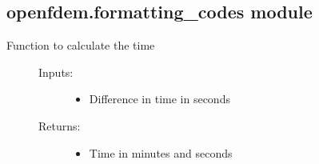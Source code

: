 \documentclass[letterpaper,10pt,english]{sphinxmanual}
\begin{document}
\subsection{openfdem.formatting\_codes module}
\label{\detokenize{openfdem:module-openfdem.formatting_codes}}\label{\detokenize{openfdem:openfdem-formatting-codes-module}}\begin{description}
\item[{Function to calculate the time}] \leavevmode\begin{description}
\item[{Inputs:}] \leavevmode\begin{itemize}
\item {} 
Difference in time in seconds

\end{itemize}

\item[{Returns:}] \leavevmode\begin{itemize}
\item {} 
Time in minutes and seconds

\end{itemize}

\end{description}

\end{description}

\begin{fulllineitems}
\label{\detokenize{openfdem:openfdem.formatting_codes.bold_text}}
\end{fulllineitems}


\begin{fulllineitems}
\label{\detokenize{openfdem:openfdem.formatting_codes.calc_timer_values}}
\end{fulllineitems}
\end{document}

